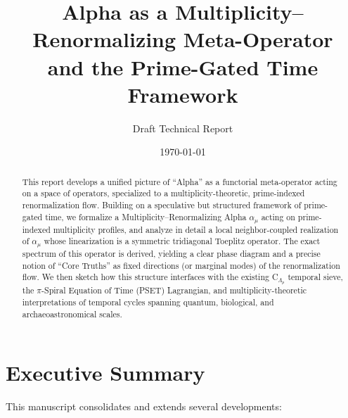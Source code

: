 \documentclass[11pt]{article}
\title{Alpha as a Multiplicity--Renormalizing Meta-Operator\\[4pt]
and the Prime-Gated Time Framework}
\author{Draft Technical Report}
\date{\today}
\begin{document}
\maketitle

\begin{abstract}
This report develops a unified picture of ``Alpha'' as a functorial meta-operator acting on a space of operators, specialized to a multiplicity-theoretic, prime-indexed renormalization flow. Building on a speculative but structured framework of prime-gated time, we formalize a Multiplicity--Renormalizing Alpha \(\alpha_\mu\) acting on prime-indexed multiplicity profiles, and analyze in detail a local neighbor-coupled realization of \(\alpha_\mu\) whose linearization is a symmetric tridiagonal Toeplitz operator. The exact spectrum of this operator is derived, yielding a clear phase diagram and a precise notion of ``Core Truths'' as fixed directions (or marginal modes) of the renormalization flow. We then sketch how this structure interfaces with the existing C\(_{\Lambda_p}\) temporal sieve, the \(\pi\)-Spiral Equation of Time (PSET) Lagrangian, and multiplicity-theoretic interpretations of temporal cycles spanning quantum, biological, and archaeoastronomical scales.
\end{abstract}

\tableofcontents

\section{Executive Summary}

This manuscript consolidates and extends several developments:
\end{document}
